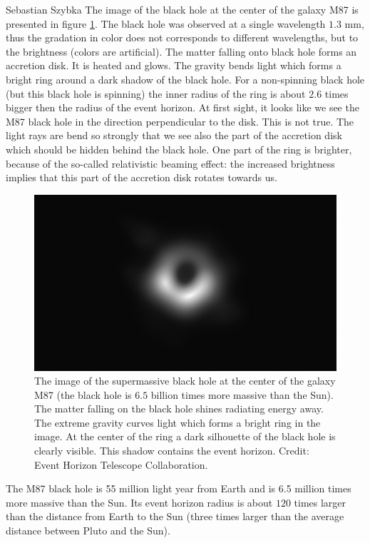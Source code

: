 \begin{artengenv}{Sebastian Szybka}
The image of the black hole at the center of the galaxy M87 is presented in figure \ref{bh}. The black hole was observed at a single wavelength $1.3$ mm, thus the gradation in color  does not corresponds to different wavelengths, but to the brightness (colors are artificial). The matter falling onto black hole forms an accretion disk. It is heated and glows. The gravity bends light which forms a bright ring around a dark shadow of the black hole. For a non-spinning black hole (but this black hole is spinning) the inner radius of the ring is about $2.6$ times bigger then the radius of the event horizon. At first sight, it looks like we see the M87 black hole in the direction perpendicular to the disk. This is not true. The light rays are bend so strongly that we see also the part of the accretion disk which should be hidden behind the black hole. One part of the ring is brighter, because of the so-called relativistic beaming effect: the increased brightness implies that this part of the accretion disk rotates towards us.
%
\begin{figure}[t!]
\begin{center}
\includegraphics[width=\textwidth]{ART_Szybka/szybka-imgbw.png}
\caption{The image of the supermassive black hole at the center of the galaxy M87 (the black hole is $6.5$ billion times more massive than the Sun). The matter falling on the black hole shines radiating energy away. The extreme gravity curves light which forms a bright ring in the image. At the center of the ring a dark silhouette of the black hole is clearly visible. This shadow contains the event horizon. Credit: Event Horizon Telescope Collaboration.}
\label{bh}
\end{center}
\end{figure}
%

 The M87 black hole is 55 million light year from Earth and is 6.5 million times more massive than the Sun. Its event horizon radius is about $120$ times larger than the distance from Earth to the Sun (three times larger than the average distance between Pluto and the Sun).


\end{artengenv}
